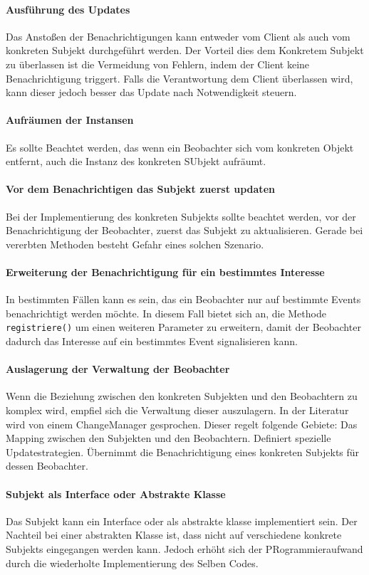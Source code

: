 \paragraph{Ausführung des Updates} Das Anstoßen der Benachrichtigungen kann entweder vom Client als auch vom konkreten Subjekt durchgeführt werden. Der Vorteil dies dem Konkretem Subjekt zu überlassen ist die Vermeidung von Fehlern, indem der Client keine Benachrichtigung triggert. Falls die Verantwortung dem Client überlassen wird, kann dieser jedoch besser das Update nach Notwendigkeit steuern.

\paragraph{Aufräumen der Instansen} Es sollte Beachtet werden, das wenn ein Beobachter sich vom konkreten Objekt entfernt, auch die Instanz des konkreten SUbjekt aufräumt. 

\paragraph{Vor dem Benachrichtigen das Subjekt zuerst updaten} Bei der Implementierung des konkreten Subjekts sollte beachtet werden, vor der Benachrichtigung der Beobachter, zuerst das Subjekt zu aktualisieren. Gerade bei vererbten Methoden besteht Gefahr eines solchen Szenario.

\paragraph{Erweiterung der Benachrichtigung für ein bestimmtes Interesse} In bestimmten Fällen kann es sein, das ein Beobachter nur auf bestimmte Events benachrichtigt werden möchte. In diesem Fall bietet sich an,  die Methode \texttt{registriere()} um einen weiteren Parameter zu erweitern, damit der Beobachter dadurch das Interesse auf ein bestimmtes Event signalisieren kann.

\paragraph{Auslagerung der Verwaltung der Beobachter} Wenn die Beziehung zwischen den konkreten Subjekten und den Beobachtern zu komplex wird, empfiel sich die Verwaltung dieser auszulagern. In der Literatur wird von einem ChangeManager gesprochen. Dieser regelt folgende Gebiete: Das Mapping zwischen den Subjekten und den Beobachtern. Definiert spezielle Updatestrategien. Übernimmt die Benachrichtigung eines konkreten Subjekts für dessen Beobachter.

\paragraph{Subjekt als Interface oder Abstrakte Klasse} Das Subjekt kann ein Interface oder als abstrakte klasse implementiert sein. Der Nachteil bei einer abstrakten Klasse ist, dass nicht auf verschiedene konkrete Subjekts eingegangen werden kann. Jedoch erhöht sich der PRogrammieraufwand durch die wiederholte Implementierung des Selben Codes.


